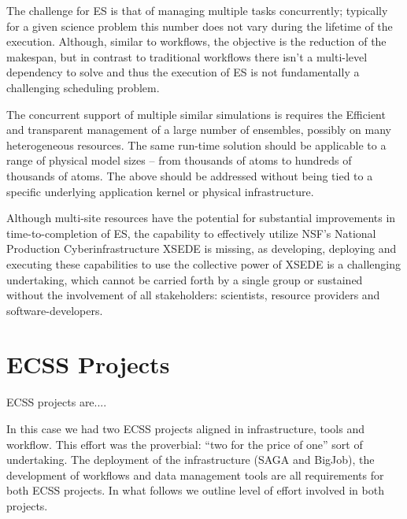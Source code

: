 \documentclass{sig-alternate}
\begin{document}


The challenge for ES is that of managing multiple tasks concurrently;
typically for a given science problem this number does not vary during
the lifetime of the execution. Although, similar to workflows, the
objective is the reduction of the makespan, but in contrast to
traditional workflows there isn't a multi-level dependency to solve
and thus the execution of ES is not fundamentally a challenging
scheduling problem.

The concurrent support of multiple similar simulations is requires the
Efficient and transparent management of a large number of ensembles,
possibly on many heterogeneous resources. The same run-time solution
should be applicable to a range of physical model sizes -- from
thousands of atoms to hundreds of thousands of atoms.%
The above should be addressed without being tied to a specific
underlying application kernel or physical infrastructure. 
 
Although multi-site resources have the potential for substantial
improvements in time-to-completion of ES, the capability to
effectively utilize NSF's National Production Cyberinfrastructure
XSEDE is missing, as developing, deploying and executing these
capabilities to use the collective power of XSEDE is a challenging
undertaking, which cannot be carried forth by a single group or
sustained without the involvement of all stakeholders: scientists,
resource providers and software-developers.

\section{ECSS Projects}

ECSS projects are....

In this case we had two ECSS projects aligned in infrastructure, tools and
workflow. This effort was the proverbial: ``two for the price of one'' sort
of undertaking. The deployment of the infrastructure (SAGA and BigJob), the
development of workflows and data management tools are all requirements
for both ECSS projects. In what follows we outline level of effort involved
in both projects.
\end{document}
